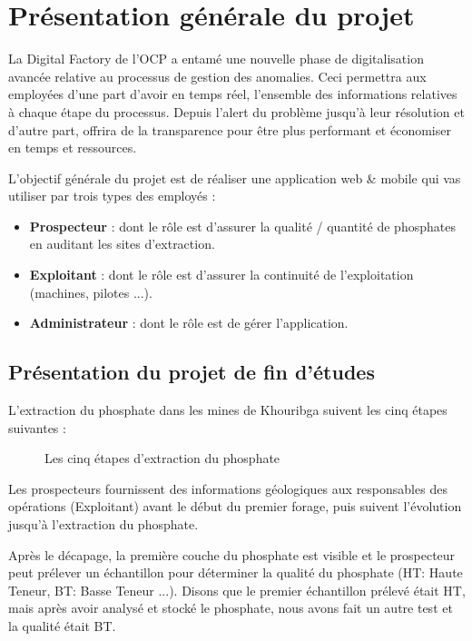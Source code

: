 \section{Pr\'esentation g\'en\'erale du projet}
La Digital Factory de l'\gls{OCP} a entam\'e une nouvelle phase de digitalisation avanc\'ee relative au processus de gestion des anomalies. Ceci permettra aux employ\'ees d'une part d'avoir en temps r\'eel, l'ensemble des informations relatives \`a chaque \'etape du processus. Depuis l'alert du probl\`eme jusqu'\`a leur r\'esolution et d'autre part, offrira de la transparence pour \^etre plus performant et \'economiser en temps et ressources.

L'objectif g\'en\'erale du projet est de r\'ealiser une application web \& mobile qui vas utiliser par trois types des employ\'es :
\begin{itemize}
\item \textbf{Prospecteur} : dont le r\^ole est d'assurer la qualit\'e / quantit\'e de phosphates en auditant les sites d'extraction.
\item \textbf{Exploitant} : dont le r\^ole est d'assurer la continuit\'e de l'exploitation (machines, pilotes ...).
\item \textbf{Administrateur} : dont le r\^ole est de g\'erer l'application. 
\end{itemize}
\subsection{Pr\'esentation du projet de fin d'\'etudes}
L'extraction du phosphate dans les mines de Khouribga suivent les cinq \'etapes suivantes :

\begin{figure}[!htb]
	\caption{\label{fig:my-label} Les cinq \'etapes d'extraction du phosphate}
\end{figure}

Les prospecteurs fournissent des informations g\'eologiques aux responsables des op\'erations (Exploitant) avant le d\'ebut du premier forage, puis suivent l'\'evolution jusqu'\`a l'extraction du phosphate.

Apr\`es le d\'ecapage, la premi\`ere couche du phosphate est visible et le prospecteur peut pr\'elever un \'echantillon pour d\'eterminer la qualit\'e du phosphate (HT: Haute Teneur, BT: Basse Teneur ...).
Disons que le premier \'echantillon pr\'elev\'e \'etait HT, mais apr\`es avoir analys\'e et stock\'e le phosphate, nous avons fait un autre test et la qualit\'e \'etait BT.

